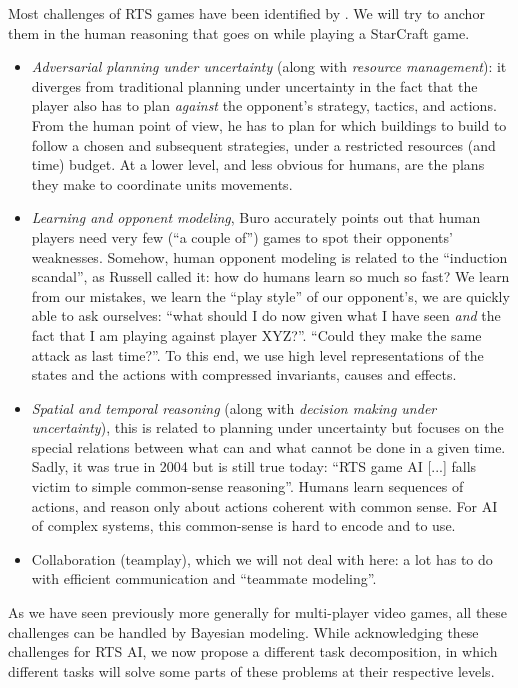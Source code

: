 Most challenges of RTS games have been identified by \citep{Buro03,Buro04callfor}. We will try to anchor them in the human reasoning that goes on while playing a StarCraft game.
\begin{itemize}
    \item \textit{Adversarial planning under uncertainty} (along with \textit{resource management}): it diverges from traditional planning under uncertainty in the fact that the player also has to plan \textit{against} the opponent's strategy, tactics, and actions. From the human point of view, he has to plan for which buildings to build to follow a chosen  and subsequent strategies, under a restricted resources (and time) budget. At a lower level, and less obvious for humans, are the plans they make to coordinate units movements.
    \item \textit{Learning and opponent modeling}, Buro accurately points out that human players need very few (``a couple of'') games to spot their opponents' weaknesses. Somehow, human opponent modeling is related to the ``induction scandal'', as Russell called it: how do humans learn so much so fast? We learn from our mistakes, we learn the ``play style'' of our opponent's, we are quickly able to ask ourselves: ``what should I do now given what I have seen \textit{and} the fact that I am playing against player XYZ?''. ``Could they make the same attack as last time?''. To this end, we use high level representations of the states and the actions with compressed invariants, causes and effects.
    \item \textit{Spatial and temporal reasoning} (along with \textit{decision making under uncertainty}), this is related to planning under uncertainty but focuses on the special relations between what can and what cannot be done in a given time. Sadly, it was true in 2004 but is still true today: ``RTS game AI [...] falls victim to simple common-sense reasoning''. Humans learn sequences of actions, and reason only about actions coherent with common sense. For AI of complex systems, this common-sense is hard to encode and to use.
    \item Collaboration (teamplay), which we will not deal with here: a lot has to do with efficient communication and ``teammate modeling''.
\end{itemize}
As we have seen previously more generally for multi-player video games, all these challenges can be handled by Bayesian modeling. %
While acknowledging these challenges for RTS AI, we now propose a different task decomposition, in which different tasks will solve some parts of these problems at their respective levels.

